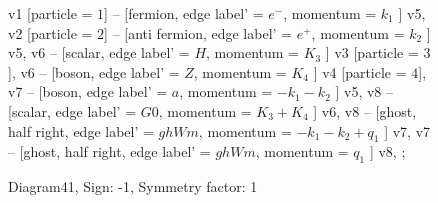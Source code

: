 \documentclass{revtex4}
\begin{document}
\begin{figure}[!htb]
\begin{center}
{    %
v1 [particle = \(1\)] -- [fermion, edge label' = \(e^{-}\), momentum = \(k_{1}\) ] v5, 
v2 [particle = \(2\)] -- [anti fermion, edge label' = \(e^{+}\), momentum = \(k_{2}\) ] v5, 
v6 -- [scalar, edge label' = \(H\), momentum = \(K_{3}\) ] v3 [particle = \(3\)], 
v6 -- [boson, edge label' = \(Z\), momentum = \(K_{4}\) ] v4 [particle = \(4\)], 
v7 -- [boson, edge label' = \(a\), momentum = \(-k_{1} - k_{2}\) ] v5, 
v8 -- [scalar, edge label' = \(G0\), momentum = \(K_{3} + K_{4}\) ] v6, 
v8 -- [ghost, half right, edge label' = \(ghWm\), momentum = \(-k_{1} - k_{2} + q_{1}\) ] v7, 
v7 -- [ghost, half right, edge label' = \(ghWm\), momentum = \(q_{1}\) ] v8, 
};
\end{center}
\caption{Diagram41, Sign: -1, Symmetry factor: 1}
\end{figure}
\newpage
\end{document}
